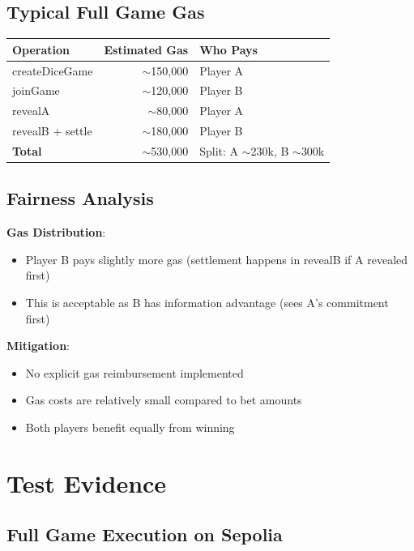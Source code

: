 \documentclass[10pt,a4paper]{article}
\begin{document}
\clearpage

\subsection*{Typical Full Game Gas}

\begin{table}[!htbp]
\centering
\begin{tabularx}{\textwidth}{X r X}
\toprule
\textbf{Operation} & \textbf{Estimated Gas} & \textbf{Who Pays} \\
\midrule
createDiceGame & $\sim$150,000 & Player A \\
joinGame & $\sim$120,000 & Player B \\
revealA & $\sim$80,000 & Player A \\
revealB + settle & $\sim$180,000 & Player B \\
\textbf{Total} & $\sim$530,000 & Split: A $\sim$230k, B $\sim$300k \\
\bottomrule
\end{tabularx}
\end{table}

\subsection*{Fairness Analysis}

\textbf{Gas Distribution}:
\begin{itemize}
    \item Player B pays slightly more gas (settlement happens in revealB if A revealed first)
    \item This is acceptable as B has information advantage (sees A's commitment first)
\end{itemize}

\textbf{Mitigation}:
\begin{itemize}
    \item No explicit gas reimbursement implemented
    \item Gas costs are relatively small compared to bet amounts
    \item Both players benefit equally from winning
\end{itemize}

\section{Test Evidence}

\subsection*{Full Game Execution on Sepolia}
\end{document}

